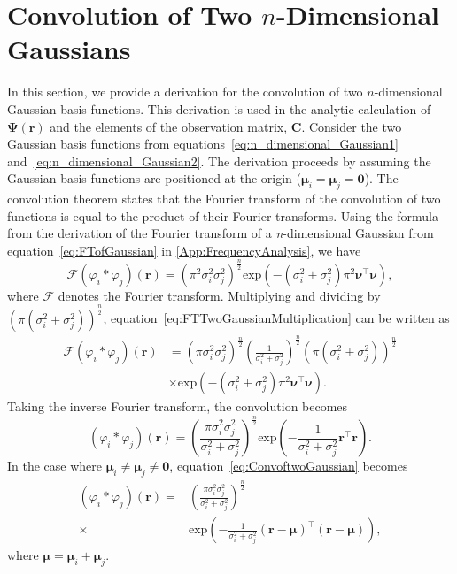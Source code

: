 \documentclass[5p,authoryear]{elsarticle}
\begin{document}
\section{Convolution of Two $n$-Dimensional Gaussians}\label{ap:ConvOfGaussians}
In this section, we provide a derivation for the convolution of two $n$-dimensional Gaussian basis functions. This derivation is used in the analytic calculation of $\boldsymbol\Psi(\mathbf{r})$ and the elements of the observation matrix, $\mathbf C$. Consider the two Gaussian basis functions from equations~\ref{eq:n_dimensional_Gaussian1} and~\ref{eq:n_dimensional_Gaussian2}. The derivation proceeds by assuming the Gaussian basis functions are positioned at the origin ($\boldsymbol\mu_i=\boldsymbol\mu_j=\mathbf 0$). The convolution theorem states that the Fourier transform of the convolution of two functions is equal to the product of their Fourier transforms. Using the formula from the derivation of the Fourier transform of a \emph{n}-dimensional Gaussian from equation~\ref{eq:FTofGaussian} in \ref{App:FrequencyAnalysis}, we have
\begin{equation}\label{eq:FTTwoGaussianMultiplication}
\mathcal{F}\left(\varphi_i*\varphi_j\right)(\mathbf{r}) = \left(\pi^2\sigma_i^2\sigma_j^2\right)^{\frac{n}{2}}\mathrm{exp}\left(-(\sigma_i^2+\sigma_j^2)\pi^2\boldsymbol\nu^\top\boldsymbol\nu\right),
\end{equation}
where $\mathcal{F}$ denotes the Fourier transform. Multiplying and dividing by $\left(\pi\left(\sigma_i^2+\sigma_j^2\right)\right)^{\frac{n}{2}}$, equation~\ref{eq:FTTwoGaussianMultiplication} can be written as 
\begin{align}
\mathcal{F}\left(\varphi_i*\varphi_j\right)(\mathbf{r})&=\left(\pi\sigma_i^2\sigma_j^2\right)^{\frac{n}{2}}\left(\frac{1}{\sigma_i^2+\sigma_j^2}\right)^{\frac{n}{2}} (\pi(\sigma_i^2+\sigma_j^2))^{\frac{n}{2}} \nonumber \\
 &\times\mathrm{exp}\left(-(\sigma_i^2+\sigma_j^2)\pi^2\boldsymbol\nu^\top\boldsymbol\nu\right).
\end{align}
Taking the inverse Fourier transform, the convolution becomes
\begin{equation}\label{eq:ConvoftwoGaussian}
 \left(\varphi_i*\varphi_j\right)(\mathbf{r}) = \left(\frac{\pi\sigma_i^2\sigma_j^2}{\sigma_i^2+\sigma_j^2}\right)^{\frac{n}{2}}\mathrm{exp}\left({-\frac{1}{\sigma_i^2+\sigma_j^2} \mathbf r^\top\mathbf r}\right).
\end{equation}
In the case where $\boldsymbol\mu_i\neq\boldsymbol\mu_j\neq\mathbf 0$, equation~\ref{eq:ConvoftwoGaussian} becomes
\begin{align}\label{eq:ConvoftwoGaussianNonzeroMean}
 \left(\varphi_i*\varphi_j\right)(\mathbf{r}) =& \left( \frac{\pi\sigma_i^2\sigma_j^2} {\sigma_i^2+\sigma_j^2}\right)^{\frac{n}{2}}\nonumber \\
\times & \mathrm{exp}\left({-\frac{1}{\sigma_i^2+\sigma_j^2} (\mathbf r-\boldsymbol\mu)^\top(\mathbf r-\boldsymbol\mu)}\right),
\end{align}
where $\boldsymbol\mu=\boldsymbol\mu_i+\boldsymbol\mu_j$.
\end{document}
